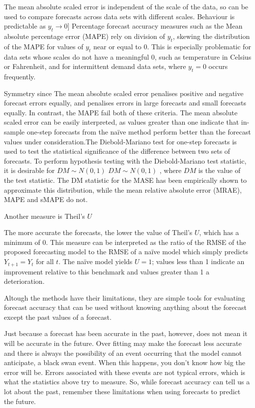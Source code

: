 The mean absolute scaled error is independent of the scale of the data, so can be used to compare forecasts across data sets with different scales. Behaviour is predictable as $y_{t}\rightarrow 0$] Percentage forecast accuracy measures such as the Mean absolute percentage error (MAPE) rely on division of $y_{t}$, skewing the distribution of the MAPE for values of $y_{t}$ near or equal to 0. This is especially problematic for data sets whose scales do not have a meaningful 0, such as temperature in Celsius or Fahrenheit, and for intermittent demand data sets, where $y_{t}=0$  occurs frequently.

Symmetry since The mean absolute scaled error penalises positive and negative forecast errors equally, and penalises errors in large forecasts and small forecasts equally. In contrast, the MAPE  fail both of these criteria. The mean absolute scaled error can be easily interpreted, as values greater than one indicate that in-sample one-step forecasts from the naïve method perform better than the forecast values under consideration.The Diebold-Mariano test for one-step forecasts is used to test the statistical significance of the difference between two sets of forecasts. To perform hypothesis testing with the Diebold-Mariano test statistic, it is desirable for $DM ∼ N ( 0 , 1 )$ $DM\sim N(0,1)$ , where $DM$ is the value of the test statistic. The DM statistic for the MASE has been empirically shown to approximate this distribution, while the mean relative absolute error (MRAE), MAPE and sMAPE do not.
 
Another measure is Theil's $U$\\
  

The more accurate the forecasts, the lower the value of Theil's $U$,   which has a minimum of 0. This measure can be interpreted as the ratio of the RMSE of the proposed forecasting model to the RMSE of  a na\"ive model which simply predicts $Y_{t+1} = Y_t$ for all $t$. The na\"ive model yields $U = 1$; values less than 1 indicate an  improvement relative to this benchmark and values greater than 1 a deterioration.

Altough the methods have their limitations, they are simple tools for evaluating forecast accuracy that can be used without knowing anything about the forecast except the past values of a forecast.

Just because a forecast has been accurate in the past, however, does not mean it will be accurate in the future. Over fitting may make the forecast less accurate and there is always the possibility of an event occurring that the model cannot anticipate, a black swan event. When this happens, you don’t know how big the error will be. Errors associated with these events are not typical errors, which is what the statistics above try to measure. So, while forecast accuracy can tell us a lot about the past, remember these limitations when using forecasts to predict the future.
